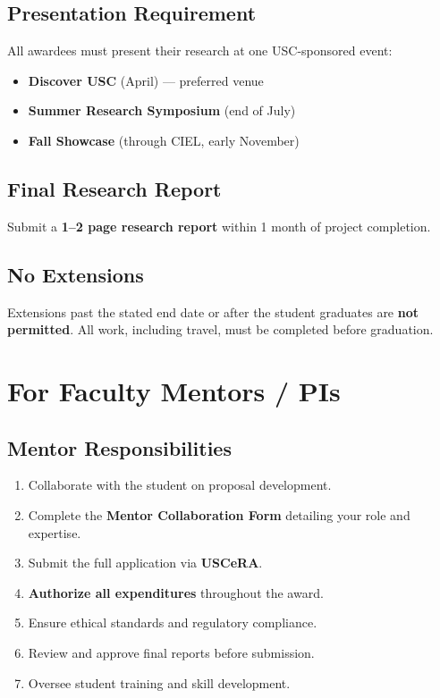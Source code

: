 \documentclass[11pt, letterpaper]{article}
\begin{document}
\subsection{Presentation Requirement}

All awardees must present their research at one USC-sponsored event:
\begin{itemize}[nosep]
    \item \textbf{Discover USC} (April) --- preferred venue
    \item \textbf{Summer Research Symposium} (end of July)
    \item \textbf{Fall Showcase} (through CIEL, early November)
\end{itemize}

\subsection{Final Research Report}

Submit a \textbf{1--2 page research report} within 1 month of project completion.

\subsection{No Extensions}

Extensions past the stated end date or after the student graduates are \textbf{not permitted}. All work, including travel, must be completed before graduation.

\section{For Faculty Mentors / PIs}

\subsection{Mentor Responsibilities}

\begin{enumerate}[nosep]
    \item Collaborate with the student on proposal development.
    \item Complete the \textbf{Mentor Collaboration Form} detailing your role and expertise.
    \item Submit the full application via \textbf{USCeRA}.
    \item \textbf{Authorize all expenditures} throughout the award.
    \item Ensure ethical standards and regulatory compliance.
    \item Review and approve final reports before submission.
    \item Oversee student training and skill development.
\end{enumerate}
\end{document}
